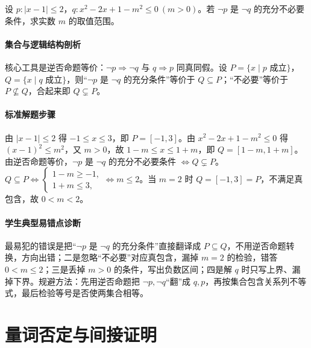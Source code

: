 \begin{problem}
设 $p:|x-1|\leq2$，$q:x^2-2x+1-m^2\leq0\ (m>0)$。若 $\neg p$ 是 $\neg q$ 的充分不必要条件，求实数 $m$ 的取值范围。
\end{problem}
\begin{solution}
\paragraph{集合与逻辑结构剖析}
核心工具是逆否命题等价：$\neg p\Rightarrow\neg q$ 与 $q\Rightarrow p$ 同真同假。设 $P=\{x\mid p\text{ 成立}\}$，$Q=\{x\mid q\text{ 成立}\}$，则“$\neg p$ 是 $\neg q$ 的充分条件”等价于 $Q\subseteq P$；“不必要”等价于 $P\not\subseteq Q$，合起来即 $Q\subsetneq P$。
\paragraph{标准解题步骤}
由 $|x-1|\leq2$ 得 $-1\leq x\leq3$，即 $P=[-1,3]$。由 $x^2-2x+1-m^2\leq0$ 得 $(x-1)^2\leq m^2$，又 $m>0$，故 $1-m\leq x\leq1+m$，即 $Q=[1-m,1+m]$。由逆否命题等价，$\neg p$ 是 $\neg q$ 的充分不必要条件 $\iff Q\subsetneq P$。$Q\subseteq P\iff\begin{cases}1-m\geq-1,\\1+m\leq3,\end{cases}\iff m\leq2$。当 $m=2$ 时 $Q=[-1,3]=P$，不满足真包含，故 $0<m<2$。
\paragraph{学生典型易错点诊断}
最易犯的错误是把“$\neg p$ 是 $\neg q$ 的充分条件”直接翻译成 $P\subseteq Q$，不用逆否命题转换，方向出错；二是忽略“不必要”对应真包含，漏掉 $m=2$ 的检验，错答 $0<m\leq2$；三是丢掉 $m>0$ 的条件，写出负数区间；四是解 $q$ 时只写上界、漏掉下界。规避方法：先用逆否命题把 $\neg p,\neg q$“翻”成 $q,p$，再按集合包含关系列不等式，最后检验等号是否使两集合相等。
\end{solution}

\section{量词否定与间接证明}

